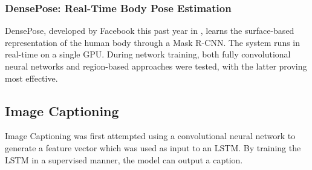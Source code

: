 \subsubsection{DensePose: Real-Time Body Pose Estimation}
DensePose, developed by Facebook this past year in \cite{DBLP:journals/corr/abs-1809-01995}, learns the surface-based representation of the human body through a Mask R-CNN.
The system runs in real-time on a single GPU.
During network training, both fully convolutional neural networks and region-based approaches were tested, with the latter proving most effective. 

\subsection{Image Captioning}
Image Captioning was first attempted using a convolutional neural network to generate a feature vector which was used as input to an LSTM.
By training the LSTM in a supervised manner, the model can output a caption.


